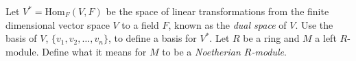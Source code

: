 \documentclass{exam}
\newcommand{\homgroup}[3]{\text{Hom}_{#1}(#2, #3)}
\begin{document}
\begin{center}
\end{center}
\vspace*{1em}
\begin{questions}
    \question[3]
        Let $V^* =\homgroup{F}{V}{F}$ be the space of linear transformations from the finite dimensional vector space $V$ to a field $F$, known 
        as the \textit{dual space} of $V$. Use the basis of $V$, $\{v_1, v_2, \dots, v_n\}$, to define a basis for $V^*$.
    \vspace*{10cm}
    \question[2]
        Let $R$ be a ring and $M$ a left $R$-module. Define what it means for $M$ to be a \textit{Noetherian $R$-module}.
\end{questions}
\end{document}
